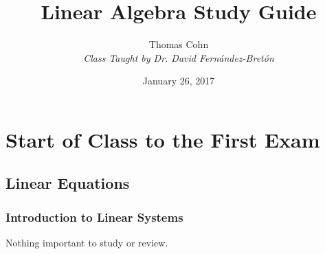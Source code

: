 \documentclass{report}
\title{Linear Algebra Study Guide}
\author{Thomas Cohn\\ \small\textit{Class Taught by Dr. David Fern\'andez-Bret\'on}}
\date{January 26, 2017}
\begin{document}
\maketitle{}

\part{Start of Class to the First Exam}

\chapter{Linear Equations}

\section{Introduction to Linear Systems}
\par Nothing important to study or review.\\
\pagebreak
\end{document}
